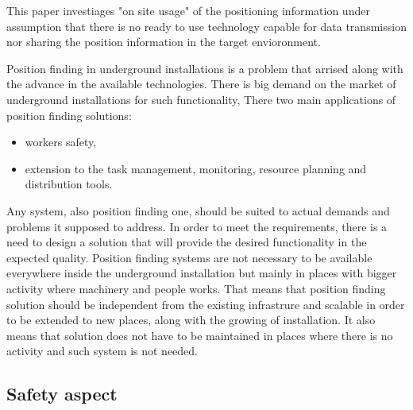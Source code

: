 \documentclass[../main.tex]{subfiles}
\begin{document}
This paper investiages "on site usage" of the positioning information under assumption that there is no ready to use technology capable for data transmission nor sharing the position information in the target envioronment.

Position finding in underground installations is a problem that arrised along with the advance in the available technologies. There is big demand on the market of underground installations for such functionality, There two main applications of position finding solutions:
\begin{itemize}
	\item workers safety,
	\item extension to the task management, monitoring, resource planning and distribution tools.
\end{itemize}


Any system, also position finding one, should be suited to actual demands and problems it supposed to address. In order to meet the requirements, there is a need to design a solution that will provide the desired functionality in the expected quality. Position finding systems are not necessary to be available everywhere inside the underground installation but mainly in places with bigger activity where machinery and people works. That means that position finding solution should be independent from the existing infrastrure and scalable in order to be extended to new places, along with the growing of installation. It also means that solution does not have to be maintained in places where there is no activity and such system is not needed.


\subsection{Safety aspect} %
\label{sub:safety_aspect}
\end{document}
